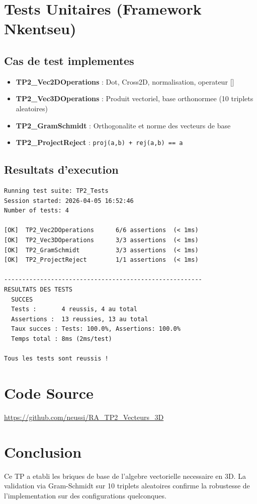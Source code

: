 \documentclass[12pt,a4paper]{article}
\begin{document}
\section{Tests Unitaires (Framework Nkentseu)}

\subsection{Cas de test implementes}

\begin{itemize}
    \item \textbf{TP2\_Vec2DOperations} : Dot, Cross2D, normalisation, operateur []
    \item \textbf{TP2\_Vec3DOperations} : Produit vectoriel, base orthonormee (10 triplets aleatoires)
    \item \textbf{TP2\_GramSchmidt} : Orthogonalite et norme des vecteurs de base
    \item \textbf{TP2\_ProjectReject} : \texttt{proj(a,b) + rej(a,b) == a}
\end{itemize}

\subsection{Resultats d'execution}

\begin{lstlisting}[caption=Sortie de jenga test -- TP2]
Running test suite: TP2_Tests
Session started: 2026-04-05 16:52:46
Number of tests: 4

[OK]  TP2_Vec2DOperations      6/6 assertions  (< 1ms)
[OK]  TP2_Vec3DOperations      3/3 assertions  (< 1ms)
[OK]  TP2_GramSchmidt          3/3 assertions  (< 1ms)
[OK]  TP2_ProjectReject        1/1 assertions  (< 1ms)

-------------------------------------------------------
RESULTATS DES TESTS
  SUCCES
  Tests :       4 reussis, 4 au total
  Assertions :  13 reussies, 13 au total
  Taux succes : Tests: 100.0%, Assertions: 100.0%
  Temps total : 8ms (2ms/test)

Tous les tests sont reussis !
\end{lstlisting}

\section{Code Source}

\begin{center}
\href{https://github.com/neussi/RA_TP2_Vecteurs_3D}{https://github.com/neussi/RA\_TP2\_Vecteurs\_3D}
\end{center}

\section{Conclusion}

Ce TP a etabli les briques de base de l'algebre vectorielle necessaire en 3D. La validation
via Gram-Schmidt sur 10 triplets aleatoires confirme la robustesse de l'implementation
sur des configurations quelconques.
\end{document}
